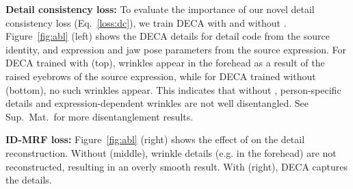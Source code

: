 \documentclass[final]{cvpr}
\newcommand{\qheading}[1]{\noindent\textbf{#1}}
\newcommand{\modelname}{DECA\xspace}
\newcommand{\supmat}{Sup.~Mat.\xspace}
\begin{document}
\qheading{Detail consistency loss:}
To evaluate the importance of our novel detail consistency loss  (Eq.~\ref{loss:dc}), we train \modelname with and without .
Figure~\ref{fig:abl} (left) shows the \modelname details for detail code  from the source identity, and expression  and jaw pose parameters  from the source expression. 
For \modelname trained with  (top), wrinkles appear in the forehead as a result of the raised eyebrows of the source expression, while for \modelname trained without  (bottom), no such wrinkles appear. 
This indicates that without , person-specific details and expression-dependent wrinkles are not well disentangled. 
See \supmat~for more disentanglement results. 

\qheading{ID-MRF loss:}
Figure~\ref{fig:abl} (right) shows the effect of  on the detail reconstruction. 
Without  (middle), wrinkle details (e.g. in the forehead) are not reconstructed, resulting in an overly smooth result.
With  (right), \modelname captures the details. 











































	
\end{document}
